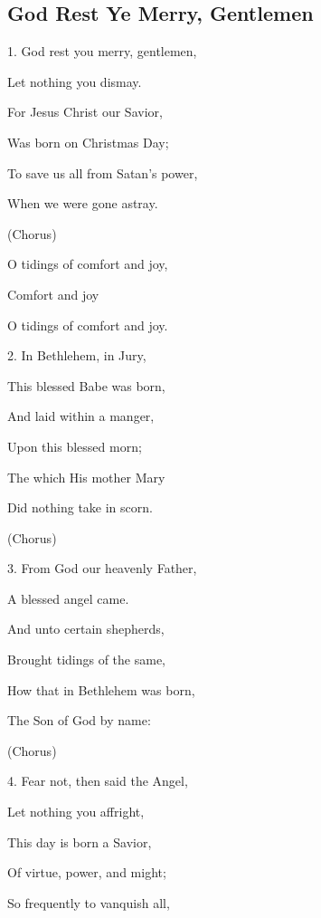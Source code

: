 \subsection{God Rest Ye Merry, Gentlemen}\label{god_rest_ye}
\begin{description}[nosep,leftmargin=\parindent,labelsep=0pt]
\item 1. God rest you merry, gentlemen, 
\item Let nothing you dismay. 
\item For Jesus Christ our Savior, 
\item Was born on Christmas Day; 
\item To save us all from Satan’s power, 
\item When we were gone astray. 
\vspace{1.5ex}
\item (Chorus) 
\item O tidings of comfort and joy, 
\item Comfort and joy 
\item O tidings of comfort and joy. 
\vspace{1.5ex}
\item 2. In Bethlehem, in Jury, 
\item This blessed Babe was born, 
\item And laid within a manger, 
\item Upon this blessed morn; 
\item The which His mother Mary 
\item Did nothing take in scorn. 
\item (Chorus) 
\vspace{1.5ex}
\item 3. From God our heavenly Father, 
\item A blessed angel came. 
\item And unto certain shepherds, 
\item Brought tidings of the same, 
\item How that in Bethlehem was born, 
\item The Son of God by name: 
\item (Chorus) 
\vspace{1.5ex}
\item 4. Fear not, then said the Angel, 
\item Let nothing you affright, 
\item This day is born a Savior, 
\item Of virtue, power, and might; 
\item So frequently to vanquish all, 

\end{description}
